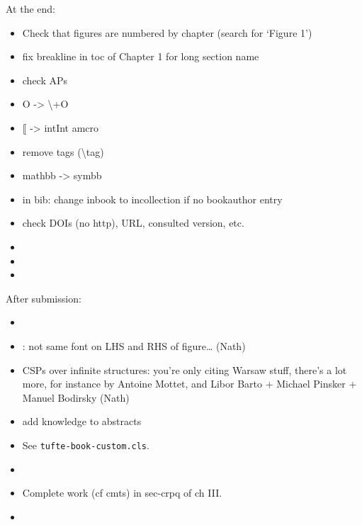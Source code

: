 At the end:
\begin{itemize}
	\item Check that figures are numbered by chapter (search for `Figure 1')
	\item fix breakline in toc of Chapter 1 for long section name
	\item check APs 
	\item O -> \backslash+O
	\item $\lBrack$ -> intInt amcro
	\item remove tags (\textsf{\backslash tag})
	\item mathbb -> symbb
	\item in bib: change inbook to incollection if no bookauthor entry
	\item check DOIs (no http), URL, consulted version, etc.
	\item {}
	\item {}
	\item {}
\end{itemize}

After submission:
\begin{itemize}
	\item {}
	\item {}: not same font on LHS and RHS of figure… (Nath)
	\item CSPs over infinite structures: you're only citing Warsaw stuff, there's a lot more, for instance by Antoine Mottet, and Libor Barto + Michael Pinsker + Manuel Bodirsky (Nath)
	\item add knowledge to abstracts
	\item {}
		See \texttt{tufte-book-custom.cls}.
	\item {}
	\item Complete work (cf cmts) in sec-crpq of ch III.
	\item {}
\end{itemize}